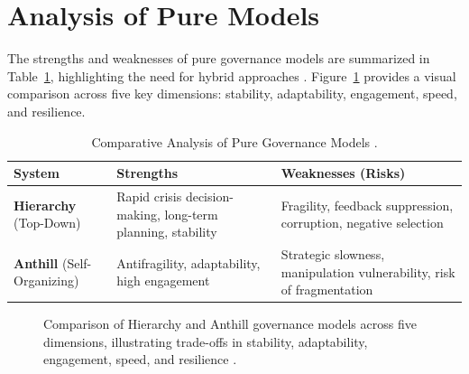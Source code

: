 \documentclass[11pt,a4paper]{article}
\begin{document}
\section{Analysis of Pure Models}
The strengths and weaknesses of pure governance models are summarized in Table~\ref{tab:pure_models}, highlighting the need for hybrid approaches \citep[lines 2262]{HybridModelsMemo}. Figure~\ref{fig:pure_models_radar} provides a visual comparison across five key dimensions: stability, adaptability, engagement, speed, and resilience.

\begin{table}[h!]
\centering
\caption{Comparative Analysis of Pure Governance Models \citep{HybridModelsMemo}.}
\label{tab:pure_models}
\begin{tabular}{@{}p{3cm}p{5.5cm}p{5.5cm}@{}}
\toprule
\textbf{System} & \textbf{Strengths} & \textbf{Weaknesses (Risks)} \\ 
\midrule
\textbf{Hierarchy} (Top-Down) & Rapid crisis decision-making, long-term planning, stability & Fragility, feedback suppression, corruption, negative selection \\
\addlinespace
\textbf{Anthill} (Self-Organizing) & Antifragility, adaptability, high engagement & Strategic slowness, manipulation vulnerability, risk of fragmentation \\ 
\bottomrule
\end{tabular}
\end{table}

\begin{figure}[h!]
\centering
{}
\caption{Comparison of Hierarchy and Anthill governance models across five dimensions, illustrating trade-offs in stability, adaptability, engagement, speed, and resilience \citep{HybridModelsMemo}.}
\label{fig:pure_models_radar}
\end{figure}
\end{document}
